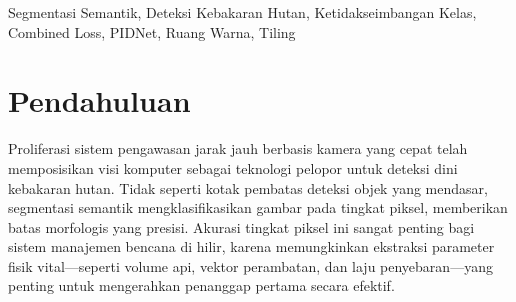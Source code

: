 \documentclass[conference]{IEEEtran}
\begin{document}
\begin{abstract}
Deteksi otomatis kebakaran dan asap melalui jaringan kamera jarak jauh sangat penting untuk memitigasi dampak kebakaran hutan. Meskipun model segmentasi semantik menawarkan batas tingkat piksel yang presisi, penerapannya sangat terhambat oleh ketidakseimbangan dataset yang ekstrem. Pada citra kebakaran hutan, objek target menempati sebagian kecil dari bingkai beresolusi tinggi, dan terdapat ketidakseimbangan intrakelas yang drastis di mana asap difus jauh lebih banyak daripada bagian depan api aktif. Dalam makalah ini, kami menunjukkan secara empiris bahwa pipeline segmentasi naif gagal secara bencana pada kelas api minoritas, hanya mencapai 62,1\% Fire mIoU pada dataset FIgLib. Untuk mengatasi hal ini, kami mengusulkan pipeline optimasi yang berpusat pada formulasi Combined Loss (Lovasz-Softmax, Focal, dan Dice) khusus yang secara eksplisit menyelamatkan kelas minoritas, meningkatkan Fire mIoU menjadi 79,9\%. Selanjutnya, kami memperkenalkan optimasi berpusat pada data sekunder---yaitu transformasi ruang warna RGCr dan algoritme Balanced SAHI-style Tiling---yang memaksa jaringan untuk memprioritaskan tanda termal api aktif dibandingkan asap difus. Studi ablasional kami mengungkap pertukaran penting: sementara Combined Loss saja menghasilkan akurasi keseluruhan tertinggi (79,9\% Fire+Smoke mIoU), penambahan strategi RGCr dan Tiling kami berhasil mendorong Fire mIoU ke state-of-the-art 81,1\%, mengorbankan sebagian kecil presisi batas asap untuk menjamin deteksi peristiwa pembakaran kritis.
\end{abstract}

\begin{IEEEkeywords}
Segmentasi Semantik, Deteksi Kebakaran Hutan, Ketidakseimbangan Kelas, Combined Loss, PIDNet, Ruang Warna, Tiling
\end{IEEEkeywords}

\section{Pendahuluan}
Proliferasi sistem pengawasan jarak jauh berbasis kamera yang cepat telah memposisikan visi komputer sebagai teknologi pelopor untuk deteksi dini kebakaran hutan. Tidak seperti kotak pembatas deteksi objek yang mendasar, segmentasi semantik mengklasifikasikan gambar pada tingkat piksel, memberikan batas morfologis yang presisi. Akurasi tingkat piksel ini sangat penting bagi sistem manajemen bencana di hilir, karena memungkinkan ekstraksi parameter fisik vital—seperti volume api, vektor perambatan, dan laju penyebaran—yang penting untuk mengerahkan penanggap pertama secara efektif.
\end{document}
